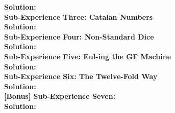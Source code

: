 \documentclass[10pt,a4paper]{report}
\begin{document}
	
	\textbf{Solution: }\\
	\newline
	\textbf{Sub-Experience Three: Catalan Numbers}\\
	
	\textbf{Solution: }\\
	\newline
	\textbf{Sub-Experience Four: Non-Standard Dice}\\
	
	\textbf{Solution: }\\
	\newline
	\textbf{Sub-Experience Five: Eul-ing the GF Machine}\\
	
	\textbf{Solution: }\\
	\newline
	\textbf{Sub-Experience Six: The Twelve-Fold Way}\\
	
	\textbf{Solution: }\\
	\newline
	\textbf{[Bonus] Sub-Experience Seven:}\\	
	
	\textbf{Solution: }\\
	\newline
\end{document}
